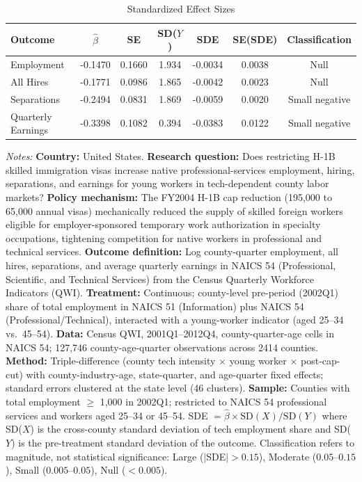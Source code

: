 \begin{table}[htbp]
\centering
\caption{Standardized Effect Sizes}
\label{tab:sde}
\begin{tabular}{lcccccc}
\toprule
Outcome & $\hat{\beta}$ & SE & SD($Y$) & SDE & SE(SDE) & Classification \\
\midrule
Employment & -0.1470 & 0.1660 & 1.934 & -0.0034 & 0.0038 & Null \\
All Hires & -0.1771 & 0.0986 & 1.865 & -0.0042 & 0.0023 & Null \\
Separations & -0.2494 & 0.0831 & 1.869 & -0.0059 & 0.0020 & Small negative \\
Quarterly Earnings & -0.3398 & 0.1082 & 0.394 & -0.0383 & 0.0122 & Small negative \\
\bottomrule
\end{tabular}
\begin{tablenotes}[flushleft]
\small
\item \textit{Notes:} \textbf{Country:} United States. \textbf{Research question:} Does restricting H-1B skilled immigration visas increase native professional-services employment, hiring, separations, and earnings for young workers in tech-dependent county labor markets? \textbf{Policy mechanism:} The FY2004 H-1B cap reduction (195,000 to 65,000 annual visas) mechanically reduced the supply of skilled foreign workers eligible for employer-sponsored temporary work authorization in specialty occupations, tightening competition for native workers in professional and technical services. \textbf{Outcome definition:} Log county-quarter employment, all hires, separations, and average quarterly earnings in NAICS 54 (Professional, Scientific, and Technical Services) from the Census Quarterly Workforce Indicators (QWI). \textbf{Treatment:} Continuous; county-level pre-period (2002Q1) share of total employment in NAICS 51 (Information) plus NAICS 54 (Professional/Technical), interacted with a young-worker indicator (aged 25--34 vs.\ 45--54). \textbf{Data:} Census QWI, 2001Q1--2012Q4, county-quarter-age cells in NAICS 54; 127,746 county-age-quarter observations across 2414 counties. \textbf{Method:} Triple-difference (county tech intensity $\times$ young worker $\times$ post-cap-cut) with county-industry-age, state-quarter, and age-quarter fixed effects; standard errors clustered at the state level (46 clusters). \textbf{Sample:} Counties with total employment $\geq$ 1,000 in 2002Q1; restricted to NAICS 54 professional services and workers aged 25--34 or 45--54. SDE $= \hat{\beta} \times \text{SD}(X) / \text{SD}(Y)$ where SD($X$) is the cross-county standard deviation of tech employment share and SD($Y$) is the pre-treatment standard deviation of the outcome. Classification refers to magnitude, not statistical significance: Large ($|$SDE$| > 0.15$), Moderate ($0.05$--$0.15$), Small ($0.005$--$0.05$), Null ($< 0.005$).
\end{tablenotes}
\end{table}

